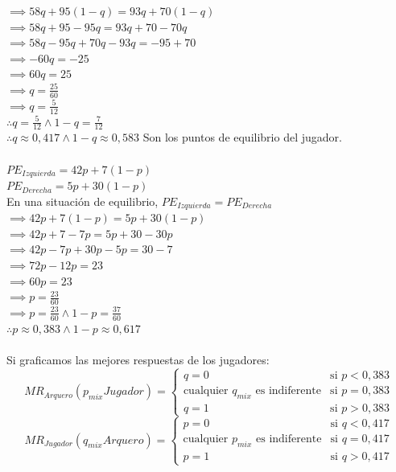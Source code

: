 \documentclass{article}
\begin{document}
                \(\implies 58q + 95(1-q) = 93q + 70(1-q)\) \\
                \(\implies 58q + 95-95q = 93q + 70-70q\) \\
                \(\implies 58q - 95q + 70q - 93q = -95 + 70\) \\
                \(\implies -60q= -25\) \\
                \(\implies 60q= 25\) \\
                \(\implies q = \frac{25}{60}\) \\
                \(\implies q = \frac{5}{12}\) \\
                \(\therefore q = \frac{5}{12} \wedge 1-q = \frac{7}{12}\) \\
                \(\therefore q \approx 0,417 \wedge 1-q \approx 0,583 \) Son los puntos de equilibrio del jugador. \\
                \\
                \(PE_{Izquierda} = 42p + 7(1-p)\) \\
                \(PE_{Derecha} = 5p + 30(1-p)\) \\
                En una situación de equilibrio, \(PE_{Izquierda} = PE_{Derecha}\) \\
                \(\implies 42p + 7(1-p) = 5p + 30(1-p)\) \\
                \(\implies 42p + 7-7p = 5p + 30-30p\) \\
                \(\implies 42p-7p+30p-5p = 30-7\) \\
                \(\implies 72p-12p = 23\) \\
                \(\implies 60p = 23\) \\
                \(\implies p = \frac{23}{60}\) \\
                \(\implies p = \frac{23}{60} \wedge 1-p = \frac{37}{60}\) \\
                \(\therefore p \approx 0,383 \wedge 1-p \approx 0,617\) \\
                \\
                Si graficamos las mejores respuestas de los jugadores:
                \[
                    MR_{Arquero}(p_{mix}Jugador) =
                    \begin{cases} 
                    q = 0 & \text{si } p < 0,383 \\ 
                    \text{cualquier $q_{mix}$ es indiferente} & \text{si } p = 0,383 \\
                    q = 1 & \text{si } p > 0,383
                    \end{cases}
                \]
                \[
                    MR_{Jugador}(q_{mix}Arquero) =
                    \begin{cases} 
                    p = 0 & \text{si } q < 0,417 \\ 
                    \text{cualquier $p_{mix}$ es indiferente} & \text{si } q = 0,417 \\
                    p = 1 & \text{si } q > 0,417
                    \end{cases}
                \]
\end{document}
